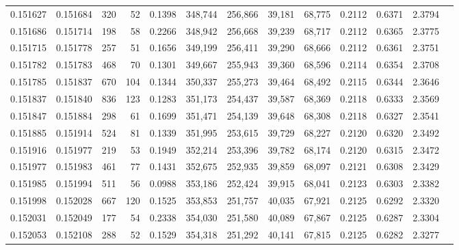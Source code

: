 \begin{tabular}{rrrrrrrrrrrrr}
0.151627 & 0.151684 &   320 &  52 &                                     0.1398 & 348,744 & 256,866 &  39,181 &  68,775 & 0.2112 & 0.6371 & 2.3794 \\
0.151686 & 0.151714 &   198 &  58 &                                     0.2266 & 348,942 & 256,668 &  39,239 &  68,717 & 0.2112 & 0.6365 & 2.3775 \\
0.151715 & 0.151778 &   257 &  51 &                                     0.1656 & 349,199 & 256,411 &  39,290 &  68,666 & 0.2112 & 0.6361 & 2.3751 \\
0.151782 & 0.151783 &   468 &  70 &                                     0.1301 & 349,667 & 255,943 &  39,360 &  68,596 & 0.2114 & 0.6354 & 2.3708 \\
0.151785 & 0.151837 &   670 & 104 &                                     0.1344 & 350,337 & 255,273 &  39,464 &  68,492 & 0.2115 & 0.6344 & 2.3646 \\
0.151837 & 0.151840 &   836 & 123 &                                     0.1283 & 351,173 & 254,437 &  39,587 &  68,369 & 0.2118 & 0.6333 & 2.3569 \\
0.151847 & 0.151884 &   298 &  61 &                                     0.1699 & 351,471 & 254,139 &  39,648 &  68,308 & 0.2118 & 0.6327 & 2.3541 \\
0.151885 & 0.151914 &   524 &  81 &                                     0.1339 & 351,995 & 253,615 &  39,729 &  68,227 & 0.2120 & 0.6320 & 2.3492 \\
0.151916 & 0.151977 &   219 &  53 &                                     0.1949 & 352,214 & 253,396 &  39,782 &  68,174 & 0.2120 & 0.6315 & 2.3472 \\
0.151977 & 0.151983 &   461 &  77 &                                     0.1431 & 352,675 & 252,935 &  39,859 &  68,097 & 0.2121 & 0.6308 & 2.3429 \\
0.151985 & 0.151994 &   511 &  56 &                                     0.0988 & 353,186 & 252,424 &  39,915 &  68,041 & 0.2123 & 0.6303 & 2.3382 \\
0.151998 & 0.152028 &   667 & 120 &                                     0.1525 & 353,853 & 251,757 &  40,035 &  67,921 & 0.2125 & 0.6292 & 2.3320 \\
0.152031 & 0.152049 &   177 &  54 &                                     0.2338 & 354,030 & 251,580 &  40,089 &  67,867 & 0.2125 & 0.6287 & 2.3304 \\
0.152053 & 0.152108 &   288 &  52 &                                     0.1529 & 354,318 & 251,292 &  40,141 &  67,815 & 0.2125 & 0.6282 & 2.3277 \\

\end{tabular}
